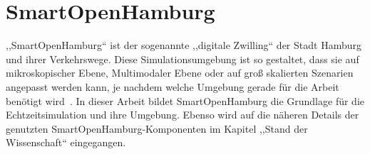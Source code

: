 %
%
\section{SmartOpenHamburg}\label{sec:smart-open-hamburg}

,,SmartOpenHamburg`` ist der sogenannte ,,digitale Zwilling`` der Stadt Hamburg und ihrer Verkehrswege.
Diese Simulationsumgebung ist so gestaltet, dass sie auf mikroskopischer Ebene, Multimodaler Ebene oder auf groß skalierten Szenarien angepasst werden kann, je nachdem welche Umgebung gerade für die Arbeit benötigt wird~\cite{Lenfers-MMT-2021}.
In dieser Arbeit bildet SmartOpenHamburg die Grundlage für die Echtzeitsimulation und ihre Umgebung.
Ebenso wird auf die näheren Details der genutzten SmartOpenHamburg-Komponenten im Kapitel ,,Stand der Wissenschaft`` eingegangen.
